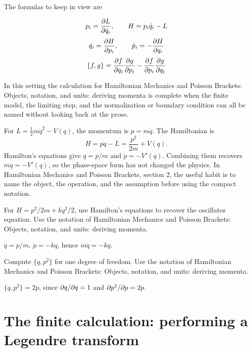 The formulas to keep in view are

\[
  p_i=\frac{\partial L}{\partial\dot q_i},\qquad H=p_i\dot q_i-L
\]
\[
  \dot q_i=\frac{\partial H}{\partial p_i},\qquad \dot p_i=-\frac{\partial H}{\partial q_i}
\]
\[
  \{f,g\}=\frac{\partial f}{\partial q_i}\frac{\partial g}{\partial p_i}-\frac{\partial f}{\partial p_i}\frac{\partial g}{\partial q_i}
\]

In this setting the calculation for Hamiltonian Mechanics and Poisson Brackets: Objects, notation, and units: deriving momenta is complete when the finite model, the limiting step, and the normalization or boundary condition can all be named without looking back at the prose.




\begin{example}
For \(L=\frac12m\dot q^2-V(q)\), the momentum is \(p=m\dot q\).  The Hamiltonian is
\[
  H=p\dot q-L=\frac{p^2}{2m}+V(q).
\]
Hamilton's equations give \(\dot q=p/m\) and \(\dot p=-V'(q)\).  Combining them recovers \(m\ddot q=-V'(q)\), so the phase-space form has not changed the physics.  In Hamiltonian Mechanics and Poisson Brackets, section 2, the useful habit is to name the object, the operation, and the assumption before using the compact notation.
\end{example}



\begin{exercise}
For \(H=p^2/2m+kq^2/2\), use Hamilton's equations to recover the oscillator equation.  Use the notation of Hamiltonian Mechanics and Poisson Brackets: Objects, notation, and units: deriving momenta.
\begin{answer}
\(\dot q=p/m\), \(\dot p=-kq\), hence \(m\ddot q=-kq\).
\end{answer}
\end{exercise}

\begin{exercise}
Compute \(\{q,p^2\}\) for one degree of freedom.  Use the notation of Hamiltonian Mechanics and Poisson Brackets: Objects, notation, and units: deriving momenta.
\begin{answer}
\(\{q,p^2\}=2p\), since \(\partial q/\partial q=1\) and \(\partial p^2/\partial p=2p\).
\end{answer}
\end{exercise}



\section{The finite calculation: performing a Legendre transform}

